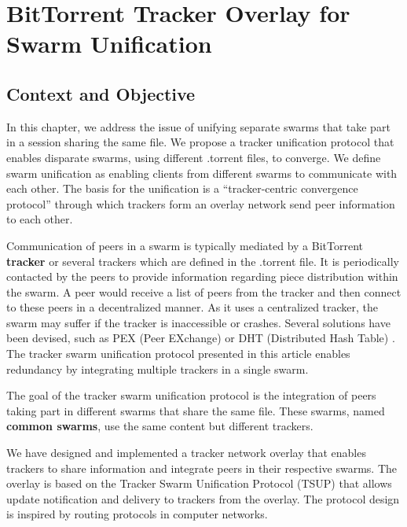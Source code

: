 
\chapter{BitTorrent Tracker Overlay for Swarm Unification}
\label{chapter:unified-tracker}




\section{Context and Objective}
\label{sec:unified-tracker:context}

In this chapter, we address the issue of unifying separate swarms that take
part in a session sharing the same file. We propose a tracker unification
protocol that enables disparate swarms, using different .torrent files, to
converge. We define swarm unification as enabling clients from different
swarms to communicate with each other. The basis for the unification is a
``tracker-centric convergence protocol'' through which trackers form an
overlay network send peer information to each other.

Communication of peers in a swarm is typically mediated by a BitTorrent
\textbf{tracker} or several trackers which are defined in the .torrent file.
It is periodically contacted by the peers to provide information regarding
piece distribution within the swarm. A peer would receive a list of peers from
the tracker and then connect to these peers in a decentralized manner. As it
uses a centralized tracker, the swarm may suffer if the tracker is
inaccessible or crashes. Several solutions have been devised, such as PEX
(Peer EXchange) \cite{dht-pex} or DHT (Distributed Hash Table)
\cite{dht-paper}. The tracker swarm unification protocol presented in this
article enables redundancy by integrating multiple trackers in a single swarm.

The goal of the tracker swarm unification protocol is the integration of peers
taking part in different swarms that share the same file. These swarms, named
\textbf{common swarms}, use the same content but different trackers.

We have designed and implemented a tracker network overlay that enables
trackers to share information and integrate peers in their respective swarms.
The overlay is based on the Tracker Swarm Unification Protocol (TSUP) that
allows update notification and delivery to trackers from the overlay. The
protocol design is inspired by routing protocols in computer networks.

